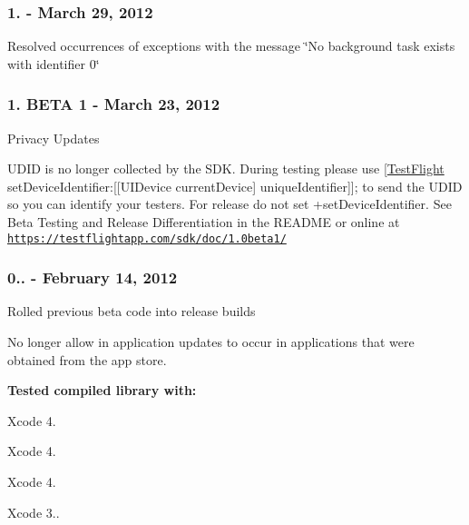 \subsubsection*{1. -\/ March 29, 2012}


\begin{DoxyItemize}
\item Resolved occurrences of exceptions with the message \char`\"{}\-No background task exists with identifier 0\char`\"{}
\end{DoxyItemize}

\subsubsection*{1. B\-E\-T\-A 1 -\/ March 23, 2012}


\begin{DoxyItemize}
\item Privacy Updates
\item U\-D\-I\-D is no longer collected by the S\-D\-K. During testing please use {\ttfamily \mbox{[}\hyperlink{interface_test_flight}{Test\-Flight} set\-Device\-Identifier\-:\mbox{[}\mbox{[}U\-I\-Device current\-Device\mbox{]} unique\-Identifier\mbox{]}\mbox{]};} to send the U\-D\-I\-D so you can identify your testers. For release do not set {\ttfamily +set\-Device\-Identifier}. See Beta Testing and Release Differentiation in the R\-E\-A\-D\-M\-E or online at \href{http://testflightapp.com/sdk/doc/1.0beta1/}{\tt https\-://testflightapp.\-com/sdk/doc/1.\-0beta1/}
\end{DoxyItemize}

\subsubsection*{0.. -\/ February 14, 2012}


\begin{DoxyItemize}
\item Rolled previous beta code into release builds
\item No longer allow in application updates to occur in applications that were obtained from the app store.
\end{DoxyItemize}

{\bfseries Tested compiled library with\-:}


\begin{DoxyItemize}
\item Xcode 4.
\item Xcode 4.
\item Xcode 4.
\item Xcode 3..
\end{DoxyItemize}

